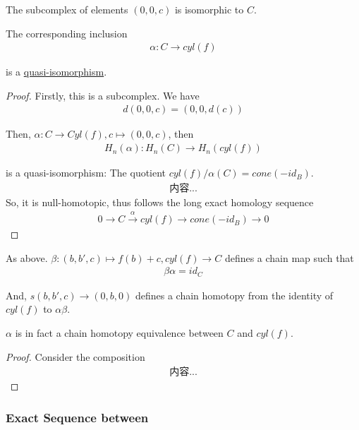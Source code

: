 \documentclass[Total.tex]{subfiles}
\begin{document}
			\begin{lemma}
				The subcomplex of elements $(0,0,c)$ is isomorphic to $C$. 
				
				The corresponding inclusion 
				\begin{gather*}
					\alpha:C\rightarrow cyl(f)
				\end{gather*}
				
				is a \underline{quasi-isomorphism}.
			\end{lemma}
			\begin{proof}
				Firstly, this is a subcomplex. We have
				\begin{gather*}
					d(0,0,c)=(0,0,d(c))
				\end{gather*}
				
				Then, $\alpha:C\rightarrow Cyl(f),c\mapsto (0,0,c)$, then
				\begin{gather*}
					H_n(\alpha):H_n(C)\rightarrow H_{n}(cyl(f))
				\end{gather*}
				
				is a quasi-isomorphism: The quotient $cyl(f)/\alpha(C)=cone(-id_B)$. 
				\begin{gather*}
					内容...
				\end{gather*}
				So, it is null-homotopic, thus follows the long exact homology sequence
				\begin{gather*}
					0\rightarrow C\stackrel{\alpha}{\rightarrow} cyl(f)\rightarrow cone(-id_B)\rightarrow 0
				\end{gather*}
			\end{proof}
			
			\begin{proposition}
				As above. $\beta:(b,b',c)\mapsto f(b)+c,cyl(f)\rightarrow C$ defines a chain map such that
				\begin{gather*}
					\beta\alpha=id_C
				\end{gather*}
				
				And, $s(b,b',c)\rightarrow (0,b,0)$ defines a chain homotopy from the identity of $cyl(f)$ to $\alpha\beta$.
				
				$\alpha$ is in fact a chain homotopy equivalence between $C$ and $cyl(f)$.
			\end{proposition}
			\begin{proof}
				Consider the composition
				\begin{gather*}
					内容...
				\end{gather*}
			\end{proof}
			\subsubsection{Exact Sequence between }
\end{document}
